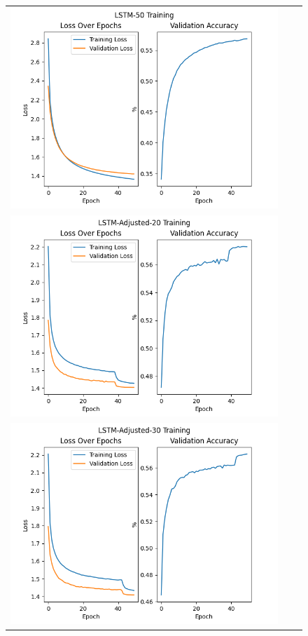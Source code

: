 \documentclass{article}
\begin{document}
\begin{enumerate}[label=1\alph*. ]
\begin{figure}[htb]
\begin{tabularx}{\textwidth}{XXX}
          \includegraphics{images/LSTM-50_training_new.png}   \\
          \includegraphics{images/LSTM-Adjusted-20_training_new.png} \\
          \includegraphics{images/LSTM-Adjusted-30_training_new.png} \\

\end{tabularx}
\end{figure}
\end{enumerate}
\end{document}
